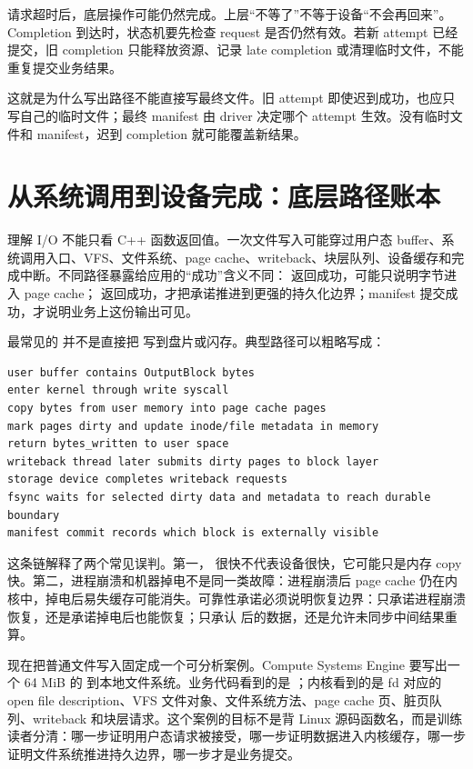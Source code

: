 请求超时后，底层操作可能仍然完成。上层“不等了”不等于设备“不会再回来”。Completion 到达时，状态机要先检查 request 是否仍然有效。若新 attempt 已经提交，旧 completion 只能释放资源、记录 late completion 或清理临时文件，不能重复提交业务结果。

这就是为什么写出路径不能直接写最终文件。旧 attempt 即使迟到成功，也应只写自己的临时文件；最终 manifest 由 driver 决定哪个 attempt 生效。没有临时文件和 manifest，迟到 completion 就可能覆盖新结果。

\section{从系统调用到设备完成：底层路径账本}

理解 I/O 不能只看 C++ 函数返回值。一次文件写入可能穿过用户态 buffer、系统调用入口、VFS、文件系统、page cache、writeback、块层队列、设备缓存和完成中断。不同路径暴露给应用的“成功”含义不同： 返回成功，可能只说明字节进入 page cache； 返回成功，才把承诺推进到更强的持久化边界；manifest 提交成功，才说明业务上这份输出可见。

最常见的  并不是直接把  写到盘片或闪存。典型路径可以粗略写成：

\begin{lstlisting}[numbers=none,caption={普通文件写入的底层事件链}]
user buffer contains OutputBlock bytes
enter kernel through write syscall
copy bytes from user memory into page cache pages
mark pages dirty and update inode/file metadata in memory
return bytes_written to user space
writeback thread later submits dirty pages to block layer
storage device completes writeback requests
fsync waits for selected dirty data and metadata to reach durable boundary
manifest commit records which block is externally visible
\end{lstlisting}

这条链解释了两个常见误判。第一， 很快不代表设备很快，它可能只是内存 copy 快。第二，进程崩溃和机器掉电不是同一类故障：进程崩溃后 page cache 仍在内核中，掉电后易失缓存可能消失。可靠性承诺必须说明恢复边界：只承诺进程崩溃恢复，还是承诺掉电后也能恢复；只承认  后的数据，还是允许未同步中间结果重算。

现在把普通文件写入固定成一个可分析案例。Compute Systems Engine 要写出一个 64 MiB 的  到本地文件系统。业务代码看到的是 ；内核看到的是 fd 对应的 open file description、VFS 文件对象、文件系统方法、page cache 页、脏页队列、writeback 和块层请求。这个案例的目标不是背 Linux 源码函数名，而是训练读者分清：哪一步证明用户态请求被接受，哪一步证明数据进入内核缓存，哪一步证明文件系统推进持久边界，哪一步才是业务提交。

